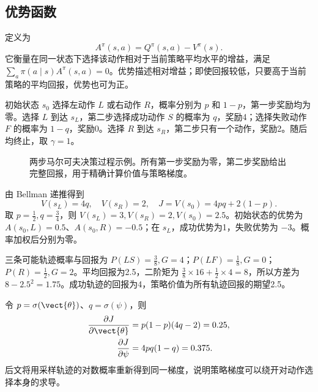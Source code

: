 \documentclass[../textbook.tex]{subfiles}
\begin{document}
\subsection{优势函数}
定义为
\begin{equation}
 A^\pi(s,a)=Q^\pi(s,a)-V^\pi(s).
 \label{eq:rl-advantage}
\end{equation}
它衡量在同一状态下选择该动作相对于当前策略平均水平的增益，满足 $\sum_a\pi(a\mid s)A^\pi(s,a)=0$。优势描述相对增益；即使回报较低，只要高于当前策略的平均回报，优势也可为正。

\begin{example}[两步决策过程中的价值与优势]


初始状态 $s_0$ 选择左动作 $L$ 或右动作 $R$，概率分别为 $p$ 和 $1-p$，第一步奖励均为零。选择 $L$ 到达 $s_L$，第二步选择成功动作 $S$ 的概率为 $q$，奖励4；选择失败动作 $F$ 的概率为 $1-q$，奖励0。选择 $R$ 到达 $s_R$，第二步只有一个动作，奖励2。随后均终止，取 $\gamma=1$。

\begin{figure}[htbp]
\centering
{}
\caption[两步马尔可夫决策过程示例]{两步马尔可夫决策过程示例。所有第一步奖励为零，第二步奖励给出完整回报，用于精确计算价值与策略梯度。}\label{fig:rl-two-step}
\end{figure}

由 Bellman 递推得到
\begin{equation*}
 V(s_L)=4q,\quad V(s_R)=2,\quad
 J=V(s_0)=4pq+2(1-p).
\end{equation*}
取 $p=\frac{1}{2},q=\frac{3}{4}$，则 $V(s_L)=3,V(s_R)=2,V(s_0)=2.5$。初始状态的优势为 $A(s_0,L)=0.5$、$A(s_0,R)=-0.5$；在 $s_L$，成功优势为1，失败优势为 $-3$。概率加权后分别为零。

三条可能轨迹概率与回报为 $P(LS)=\frac{3}{8},G=4$；$P(LF)=\frac{1}{8},G=0$；$P(R)=\frac{1}{2},G=2$。平均回报为2.5，二阶矩为 $\tfrac38\times16+\tfrac12\times4=8$，所以方差为 $8-2.5^2=1.75$。成功轨迹的回报为4，策略价值为所有轨迹回报的期望2.5。

令 $p=\sigma(\vect{\theta})$、$q=\sigma(\psi)$，则
\begin{align*}
 \frac{\partial J}{\partial\vect{\theta}}&=p(1-p)(4q-2)=0.25,\\
 \frac{\partial J}{\partial\psi}&=4pq(1-q)=0.375.
\end{align*}
后文将用采样轨迹的对数概率重新得到同一梯度，说明策略梯度可以绕开对动作选择本身的求导。
\end{example}
\end{document}
